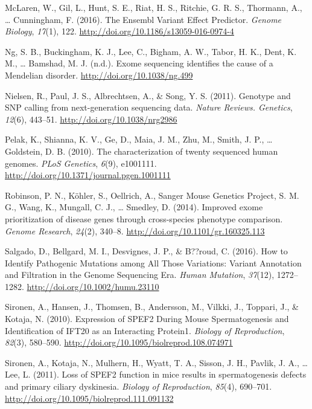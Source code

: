 \documentclass[12pt,twoside]{reedthesis}
\theoremstyle{definition}
\theoremstyle{definition}
\theoremstyle{remark}
\begin{document}
  \hypertarget{ref-McLaren2016}{}
  McLaren, W., Gil, L., Hunt, S. E., Riat, H. S., Ritchie, G. R. S.,
  Thormann, A., \ldots{} Cunningham, F. (2016). The Ensembl Variant Effect
  Predictor. \emph{Genome Biology}, \emph{17}(1), 122.
  \url{http://doi.org/10.1186/s13059-016-0974-4}
  
  \hypertarget{ref-Ng}{}
  Ng, S. B., Buckingham, K. J., Lee, C., Bigham, A. W., Tabor, H. K.,
  Dent, K. M., \ldots{} Bamshad, M. J. (n.d.). Exome sequencing identifies
  the cause of a Mendelian disorder. \url{http://doi.org/10.1038/ng.499}
  
  \hypertarget{ref-Nielsen2011}{}
  Nielsen, R., Paul, J. S., Albrechtsen, A., \& Song, Y. S. (2011).
  Genotype and SNP calling from next-generation sequencing data.
  \emph{Nature Reviews. Genetics}, \emph{12}(6), 443--51.
  \url{http://doi.org/10.1038/nrg2986}
  
  \hypertarget{ref-Pelak2010}{}
  Pelak, K., Shianna, K. V., Ge, D., Maia, J. M., Zhu, M., Smith, J. P.,
  \ldots{} Goldstein, D. B. (2010). The characterization of twenty
  sequenced human genomes. \emph{PLoS Genetics}, \emph{6}(9), e1001111.
  \url{http://doi.org/10.1371/journal.pgen.1001111}
  
  \hypertarget{ref-Robinson2014}{}
  Robinson, P. N., Köhler, S., Oellrich, A., Sanger Mouse Genetics
  Project, S. M. G., Wang, K., Mungall, C. J., \ldots{} Smedley, D.
  (2014). Improved exome prioritization of disease genes through
  cross-species phenotype comparison. \emph{Genome Research},
  \emph{24}(2), 340--8. \url{http://doi.org/10.1101/gr.160325.113}
  
  \hypertarget{ref-Salgado2016}{}
  Salgado, D., Bellgard, M. I., Desvignes, J. P., \& B??roud, C. (2016).
  How to Identify Pathogenic Mutations among All Those Variations: Variant
  Annotation and Filtration in the Genome Sequencing Era. \emph{Human
  Mutation}, \emph{37}(12), 1272--1282.
  \url{http://doi.org/10.1002/humu.23110}
  
  \hypertarget{ref-Sironen2010}{}
  Sironen, A., Hansen, J., Thomsen, B., Andersson, M., Vilkki, J.,
  Toppari, J., \& Kotaja, N. (2010). Expression of SPEF2 During Mouse
  Spermatogenesis and Identification of IFT20 as an Interacting Protein1.
  \emph{Biology of Reproduction}, \emph{82}(3), 580--590.
  \url{http://doi.org/10.1095/biolreprod.108.074971}
  
  \hypertarget{ref-Sironen2011}{}
  Sironen, A., Kotaja, N., Mulhern, H., Wyatt, T. A., Sisson, J. H.,
  Pavlik, J. A., \ldots{} Lee, L. (2011). Loss of SPEF2 function in mice
  results in spermatogenesis defects and primary ciliary dyskinesia.
  \emph{Biology of Reproduction}, \emph{85}(4), 690--701.
  \url{http://doi.org/10.1095/biolreprod.111.091132}
  
\end{document}

